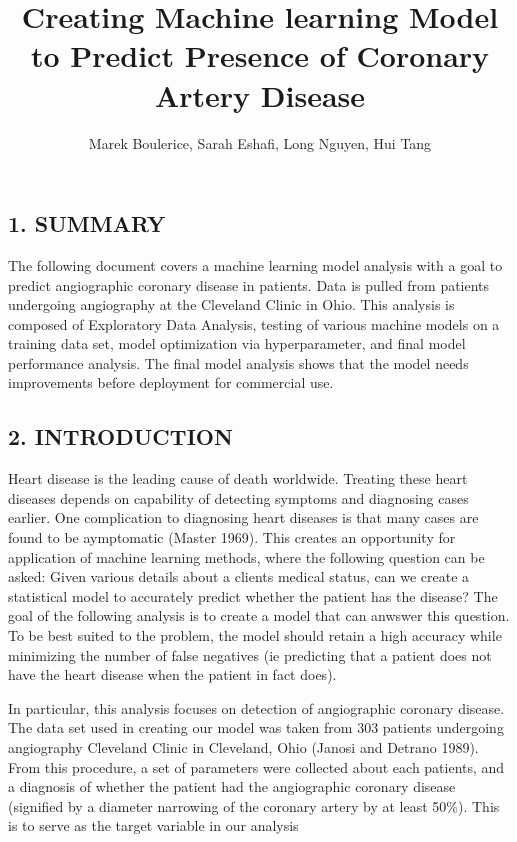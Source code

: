 \documentclass[
  letterpaper,
  DIV=11,
  numbers=noendperiod]{scrartcl}
\title{Creating Machine learning Model to Predict Presence of Coronary
Artery Disease}
\author{Marek Boulerice, Sarah Eshafi, Long Nguyen, Hui Tang}
\date{}
\renewcommand*\contentsname{Table of contents}
\newcommand\contentsname{Table of contents}
\begin{document}
\maketitle

\renewcommand*\contentsname{Table of contents}
{
\hypersetup{linkcolor=}
\setcounter{tocdepth}{3}
\tableofcontents
}

\subsection{1. SUMMARY}\label{summary}

The following document covers a machine learning model analysis with a
goal to predict angiographic coronary disease in patients. Data is
pulled from patients undergoing angiography at the Cleveland Clinic in
Ohio. This analysis is composed of Exploratory Data Analysis, testing of
various machine models on a training data set, model optimization via
hyperparameter, and final model performance analysis. The final model
analysis shows that the model needs improvements before deployment for
commercial use.

\subsection{2. INTRODUCTION}\label{introduction}

Heart disease is the leading cause of death worldwide. Treating these
heart diseases depends on capability of detecting symptoms and
diagnosing cases earlier. One complication to diagnosing heart diseases
is that many cases are found to be aymptomatic (Master 1969). This
creates an opportunity for application of machine learning methods,
where the following question can be asked: Given various details about a
clients medical status, can we create a statistical model to accurately
predict whether the patient has the disease? The goal of the following
analysis is to create a model that can anwswer this question. To be best
suited to the problem, the model should retain a high accuracy while
minimizing the number of false negatives (ie predicting that a patient
does not have the heart disease when the patient in fact does).

In particular, this analysis focuses on detection of angiographic
coronary disease. The data set used in creating our model was taken from
303 patients undergoing angiography Cleveland Clinic in Cleveland, Ohio
(Janosi and Detrano 1989). From this procedure, a set of parameters were
collected about each patients, and a diagnosis of whether the patient
had the angiographic coronary disease (signified by a diameter narrowing
of the coronary artery by at least 50\%). This is to serve as the target
variable in our analysis
\end{document}
